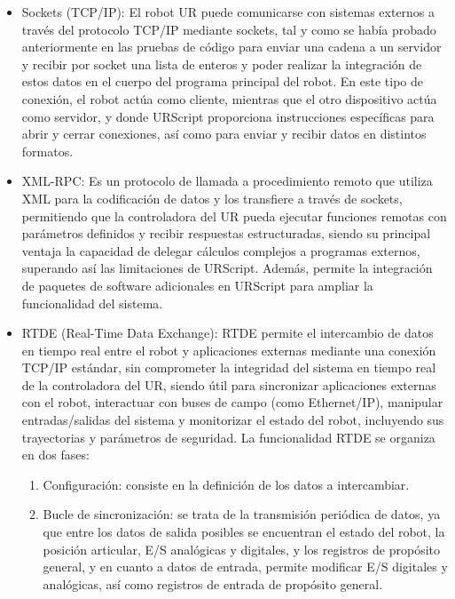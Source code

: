 \begin{itemize}
    \item Sockets (TCP/IP): El robot UR puede comunicarse con sistemas externos a través del protocolo TCP/IP mediante sockets, tal y como se había probado anteriormente en las pruebas de código para enviar una cadena a un servidor y recibir por socket una lista de enteros y poder realizar la integración de estos datos en el cuerpo del programa principal del robot. En este tipo de conexión, el robot actúa como cliente, mientras que el otro dispositivo actúa como servidor, y donde URScript proporciona instrucciones específicas para abrir y cerrar conexiones, así como para enviar y recibir datos en distintos formatos. 
    
    \item XML-RPC: Es un protocolo de llamada a procedimiento remoto que utiliza XML para la codificación de datos y los transfiere a través de sockets, permitiendo que la controladora del UR pueda ejecutar funciones remotas con parámetros definidos y recibir respuestas estructuradas, siendo su principal ventaja la capacidad de delegar cálculos complejos a programas externos, superando así las limitaciones de URScript. Además, permite la integración de paquetes de software adicionales en URScript para ampliar la funcionalidad del sistema.
    
    \item RTDE (Real-Time Data Exchange): RTDE permite el intercambio de datos en tiempo real entre el robot y aplicaciones externas mediante una conexión TCP/IP estándar, sin comprometer la integridad del sistema en tiempo real de la controladora del UR, siendo útil para sincronizar aplicaciones externas con el robot, interactuar con buses de campo (como Ethernet/IP), manipular entradas/salidas del sistema y monitorizar el estado del robot, incluyendo sus trayectorias y parámetros de seguridad. La funcionalidad RTDE se organiza en dos fases:
      \begin{enumerate}
        \item Configuración: consiste en la definición de los datos a intercambiar.
        \item Bucle de sincronización: se trata de la transmisión periódica de datos, ya que entre los datos de salida posibles se encuentran el estado del robot, la posición articular, E/S analógicas y digitales, y los registros de propósito general, y en cuanto a datos de entrada, permite modificar E/S digitales y analógicas, así como registros de entrada de propósito general.
      \end{enumerate}
\end{itemize}

